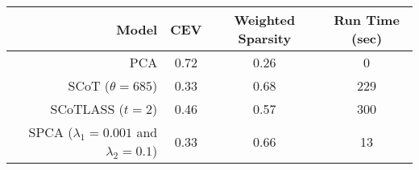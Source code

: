 \begin{tabular}{r|ccc}
\toprule
{Model} &  CEV &  Weighted Sparsity & Run Time (sec) \\
\midrule
PCA                                          &                 0.72 &      0.26 &              0 \\
SCoT ($\theta = 685$)                        &                 0.33 &      0.68 &            229 \\
SCoTLASS ($t = 2$)                           &                 0.46 &      0.57 &            300 \\
SPCA ($\lambda_1=0.001$ and $\lambda_2=0.1$) &                 0.33 &      0.66 &             13 \\
\bottomrule
\end{tabular}
